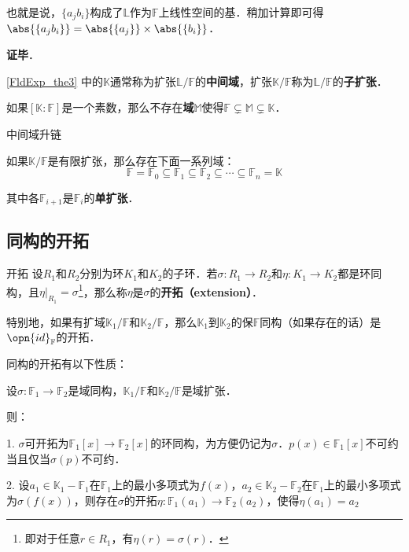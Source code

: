也就是说，$\{a_jb_i\}$构成了$\mathbb{L}$作为$\mathbb{F}$上线性空间的基．稍加计算即可得$\abs{\{a_jb_i\}}=\abs{\{a_j\}}\times\abs{\{b_i\}}$．





\textbf{证毕}．


\autoref{FldExp_the3} 中的$\mathbb{K}$通常称为扩张$\mathbb{L}/\mathbb{F}$的\textbf{中间域}，扩张$\mathbb{K}/\mathbb{F}$称为$\mathbb{L}/\mathbb{F}$的\textbf{子扩张}．






\begin{corollary}{}
如果$[\mathbb{K}:\mathbb{F}]$是一个素数，那么不存在\textbf{域}$\mathbb{M}$使得$\mathbb{F}\subsetneq\mathbb{M}\subsetneq\mathbb{K}$．
\end{corollary}


\begin{corollary}{中间域升链}\label{FldExp_cor3}

如果$\mathbb{K}/\mathbb{F}$是有限扩张，那么存在下面一系列域：
\begin{equation}
\mathbb{F}=\mathbb{F}_0\subseteq\mathbb{F}_1\subseteq\mathbb{F}_2\subseteq\cdots\subseteq\mathbb{F}_n=\mathbb{K}
\end{equation}

其中各$\mathbb{F}_{i+1}$是$\mathbb{F}_i$的\textbf{单扩张}．

\end{corollary}





\subsection{同构的开拓}

\begin{definition}{开拓}\label{FldExp_def6}
设$R_1$和$R_2$分别为环$K_1$和$K_2$的子环．若$\sigma:R_1\to R_2$和$\eta:K_1\to K_2$都是环同构，且$\eta|_{R_1}=\sigma$\footnote{即对于任意$r\in R_1$，有$\eta(r)=\sigma(r)$．}，那么称$\eta$是$\sigma$的\textbf{开拓（extension）}．
\end{definition}

特别地，如果有扩域$\mathbb{K}_1/\mathbb{F}$和$\mathbb{K}_2/\mathbb{F}$，那么$\mathbb{K}_1$到$\mathbb{K}_2$的保$\mathbb{F}$同构（如果存在的话）是$\opn{id}_\mathbb{F}$的开拓．

同构的开拓有以下性质：

\begin{theorem}{}\label{FldExp_the4}
设$\sigma:\mathbb{F}_1\to\mathbb{F}_2$是域同构，$\mathbb{K}_1/\mathbb{F}$和$\mathbb{K}_2/\mathbb{F}$是域扩张．

则：

1. $\sigma$可开拓为$\mathbb{F}_1[x]\to\mathbb{F}_2[x]$的环同构，为方便仍记为$\sigma$．$p(x)\in\mathbb{F}_1[x]$不可约当且仅当$\sigma(p)$不可约．

2. 设$a_1\in\mathbb{K}_1-\mathbb{F}_1$在$\mathbb{F}_1$上的最小多项式为$f(x)$，$a_2\in\mathbb{K}_2-\mathbb{F}_2$在$\mathbb{F}_1$上的最小多项式为$\sigma(f(x))$，则存在$\sigma$的开拓$\eta:\mathbb{F}_1(a_1)\to \mathbb{F}_2(a_2)$，使得$\eta(a_1)=a_2$
\end{theorem}

